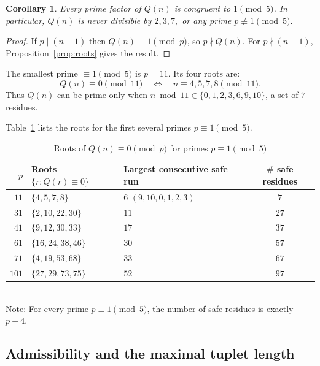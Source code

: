 \documentclass[11pt,a4paper]{article}
\theoremstyle{plain}
\newtheorem{corollary}[theorem]{Corollary}
\theoremstyle{definition}
\theoremstyle{remark}
\begin{document}
\begin{corollary}\label{cor:divisibility}
Every prime factor of $Q(n)$ is congruent to $1 \pmod{5}$. In particular, $Q(n)$ is never divisible by $2, 3, 7,$ or any prime $p \not\equiv 1 \pmod{5}$.
\end{corollary}

\begin{proof}
If $p \mid (n-1)$ then $Q(n) \equiv 1 \pmod{p}$, so $p \nmid Q(n)$. For $p \nmid (n-1)$, Proposition~\ref{prop:roots} gives the result.
\end{proof}

The smallest prime $\equiv 1 \pmod{5}$ is $p = 11$. Its four roots are:
\begin{equation}\label{eq:roots11}
Q(n) \equiv 0 \pmod{11} \quad\Longleftrightarrow\quad n \equiv 4, 5, 7, 8 \pmod{11}.
\end{equation}
Thus $Q(n)$ can be prime only when $n \bmod 11 \in \{0, 1, 2, 3, 6, 9, 10\}$, a set of $7$ residues.

Table~\ref{tab:roots} lists the roots for the first several primes $p \equiv 1 \pmod{5}$.

\begin{table}[ht]
\centering
\caption{Roots of $Q(n) \equiv 0 \pmod{p}$ for primes $p \equiv 1 \pmod{5}$}
\label{tab:roots}
\smallskip
\begin{tabular}{@{}rllc@{}}
\toprule
$p$ & Roots $\{r : Q(r) \equiv 0\}$ & Largest consecutive safe run & $\#$ safe residues \\
\midrule
$11$  & $\{4, 5, 7, 8\}$     & $6$ \;\;$(9,10,0,1,2,3)$ & $7$ \\
$31$  & $\{2, 10, 22, 30\}$   & $11$  & $27$ \\
$41$  & $\{9, 12, 30, 33\}$   & $17$  & $37$ \\
$61$  & $\{16, 24, 38, 46\}$  & $30$  & $57$ \\
$71$  & $\{4, 19, 53, 68\}$   & $33$  & $67$ \\
$101$ & $\{27, 29, 73, 75\}$  & $52$  & $97$ \\
\bottomrule
\end{tabular}\\[4pt]
\small Note: For every prime $p \equiv 1 \pmod{5}$, the number of safe residues is exactly $p - 4$.
\end{table}

\subsection{Admissibility and the maximal tuplet length}
\end{document}
